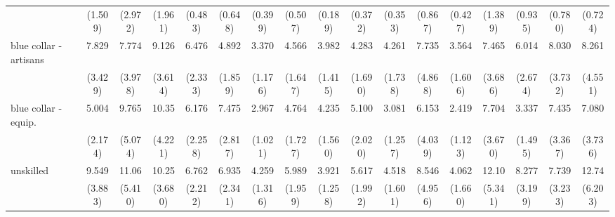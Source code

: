 {\begin{tabular}{l*{16}{c}}
                    &     (1.509)         &     (2.972)         &     (1.961)         &     (0.483)         &     (0.648)         &     (0.399)         &     (0.507)         &     (0.189)         &     (0.372)         &     (0.353)         &     (0.867)         &     (0.427)         &     (1.389)         &     (0.935)         &     (0.780)         &     (0.724)         \\
[1em]
blue collar - artisans&       7.829\sym{***}&       7.774\sym{***}&       9.126\sym{***}&       6.476\sym{***}&       4.892\sym{***}&       3.370\sym{***}&       4.566\sym{***}&       3.982\sym{***}&       4.283\sym{***}&       4.261\sym{***}&       7.735\sym{**} &       3.564\sym{**} &       7.465\sym{***}&       6.014\sym{***}&       8.030\sym{***}&       8.261\sym{***}\\
                    &     (3.429)         &     (3.978)         &     (3.614)         &     (2.333)         &     (1.859)         &     (1.176)         &     (1.647)         &     (1.415)         &     (1.690)         &     (1.738)         &     (4.868)         &     (1.606)         &     (3.686)         &     (2.674)         &     (3.732)         &     (4.551)         \\
[1em]
blue collar - equip.&       5.004\sym{***}&       9.765\sym{***}&       10.35\sym{***}&       6.176\sym{***}&       7.475\sym{***}&       2.967\sym{**} &       4.764\sym{***}&       4.235\sym{***}&       5.100\sym{***}&       3.081\sym{**} &       6.153\sym{**} &       2.419         &       7.704\sym{***}&       3.337\sym{**} &       7.435\sym{***}&       7.080\sym{***}\\
                    &     (2.174)         &     (5.074)         &     (4.221)         &     (2.258)         &     (2.817)         &     (1.021)         &     (1.727)         &     (1.560)         &     (2.020)         &     (1.257)         &     (4.039)         &     (1.123)         &     (3.670)         &     (1.495)         &     (3.367)         &     (3.736)         \\
[1em]
unskilled           &       9.549\sym{***}&       11.06\sym{***}&       10.25\sym{***}&       6.762\sym{***}&       6.935\sym{***}&       4.259\sym{***}&       5.989\sym{***}&       3.921\sym{***}&       5.617\sym{***}&       4.518\sym{***}&       8.546\sym{***}&       4.062\sym{***}&       12.10\sym{***}&       8.277\sym{***}&       7.739\sym{***}&       12.74\sym{***}\\
                    &     (3.883)         &     (5.410)         &     (3.680)         &     (2.212)         &     (2.341)         &     (1.316)         &     (1.959)         &     (1.258)         &     (1.992)         &     (1.601)         &     (4.956)         &     (1.660)         &     (5.341)         &     (3.199)         &     (3.233)         &     (6.203)         \\

\end{tabular}}

